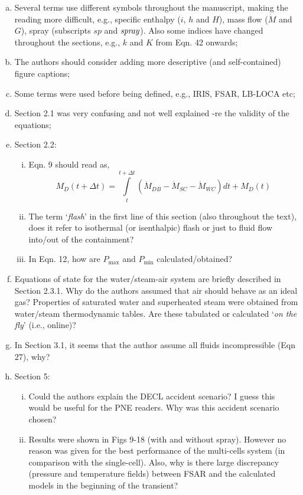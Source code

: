 \documentclass[14pt,twoside]{report}
\begin{document}
\begin{enumerate}[(a)] 
%
\item Several terms use different symbols throughout the manuscript, making the reading more difficult, e.g., specific enthalpy ($i$, $h$ and $H$), mass flow ($\dot{M}$ and $G$), spray (subscripts $sp$ and $\text{\it spray}$). Also some indices have changed throughout the sections, e.g., $k$ and $K$ from Eqn. 42 onwards;
%
\item The authors should consider adding more descriptive (and self-contained) figure captions;
%
\item Some terms were used before being defined, e.g., IRIS, FSAR, LB-LOCA etc;
%
\item Section 2.1 was very confusing and not well explained -re the validity of the equations;
%
\item Section 2.2:
   \begin{enumerate}[(i)]
      \item Eqn. 9 should read as,
        \begin{displaymath} 
           M_{D}\left(t+\Delta t\right) = \int\limits_{t}^{t+\Delta t} \left(\dot{M}_{DB}-\dot{M}_{SC}-\dot{M}_{WC}\right)dt + M_{D}(t)
        \end{displaymath}
      \item The term `{\it flash}' in the first line of this section (also throughout the text), does it refer to isothermal (or isenthalpic) flash or just to fluid flow into/out of the containment?
      \item In Eqn. 12, how are $P_{\text{max}}$ and $P_{\text{min}}$ calculated/obtained? 
   \end{enumerate}
%
\item Equations of state for the water/steam-air system are briefly described in Section 2.3.1. Why do the authors assumed that air should behave as an ideal gas? Properties of saturated water and superheated steam were obtained from water/steam thermodynamic tables. Are these tabulated or calculated `{\it on the fly}' (i.e., online)?
%
\item In Section 3.1, it seems that the author assume all fluids incompressible (Eqn 27), why?
%
\item Section 5:
   \begin{enumerate}[(i)]
      \item Could the authors explain the DECL accident scenario? I guess this would be useful for the PNE readers. Why was this accident scenario chosen?
      \item Results were shown in Figs 9-18 (with and without spray). However no reason was given for the best performance of the multi-cells system (in comparison with the single-cell). Also, why is there large discrepancy (pressure and temperature fields) between FSAR and the calculated models in the beginning of the transient?  
   \end{enumerate}   
%
\end{enumerate}
\end{document}
